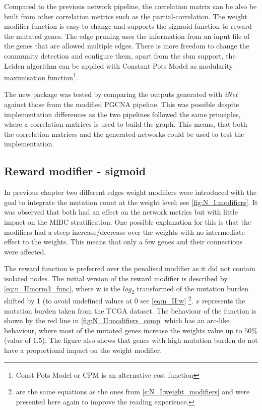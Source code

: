 Compared to the previous network pipeline, the correlation matrix can be also be built from other correlation metrics such as the partial-correlation. The weight modifier function is easy to change and supports the sigmoid function to reward the mutated genes. The edge pruning uses the information from an input file of the genes that are allowed multiple edges. There is more freedom to change the community detection and configure them, apart from the \acrfull{sbm} support, the Leiden algorithm can be applied with Constant Pots Model as modularity maximisation function\footnote{Const Pots Model or CPM is an alternative cost function}.

The new package was tested by comparing the outputs generated with \textit{iNet} against those from the modified PGCNA pipeline. This was possible despite implementation differences as the two pipelines followed the same principles, where a correlation matrices is used to build the graph. This means, that both the correlation matrices and the generated networks could be used to test the implementation.

\subsection*{Reward modifier - sigmoid} \label{s:N_II:reward}

In previous chapter two different edges weight modifiers were introduced with the goal to integrate the mutation count at the weight level; see \cref{fig:N_I:modifiers}. It was observed that both had an effect on the network metrics but with little impact on the MIBC stratification. One possible explanation for this is that the modifiers had a steep increase/decrease over the weights with no intermediate effect to the weights. This means that only a few genes and their connections were affected.

The reward function is preferred over the penalised modifier as it did not contain isolated nodes. The initial version of the reward modifier is described by \cref{eq:n_II:norm3_func}, where w is the $log_2$ transformed of the mutation burden shifted by 1 (to avoid undefined values at 0 see \cref{eq:n_II:w} \footnote{ are the same equations as the ones from \cref{s:N_I:weight_modifiers} and were presented here again to improve the reading experience.}. $x$ represents the mutation burden taken from the TCGA dataset.  The behaviour of the function is shown by the red line in \cref{fig:N_II:modifiers_comp} which has an arc-like behaviour, where most of the mutated genes increase the weights value up to $50\%$ (value of $1.5$). The figure also shows that genes with high mutation burden do not have a proportional impact on the weight modifier.

